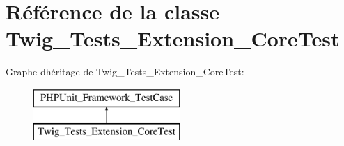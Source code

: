 \hypertarget{class_twig___tests___extension___core_test}{}\section{Référence de la classe Twig\+\_\+\+Tests\+\_\+\+Extension\+\_\+\+Core\+Test}
\label{class_twig___tests___extension___core_test}
Graphe d\textquotesingle{}héritage de Twig\+\_\+\+Tests\+\_\+\+Extension\+\_\+\+Core\+Test\+:\begin{figure}[H]
\begin{center}
\leavevmode
\includegraphics[height=2.000000cm]{class_twig___tests___extension___core_test}
\end{center}
\end{figure}

